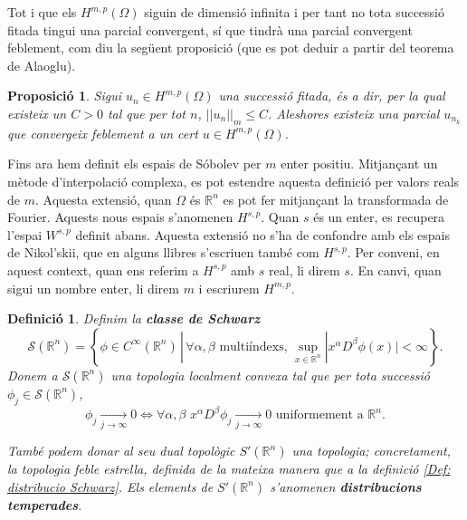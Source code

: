 \documentclass{article}
\numberwithin{equation}{section}
\newtheorem{definicio}{Definici\'{o}}[section]
\newtheorem{proposicio}{Proposici\'{o}}[section]
\begin{document}
Tot i que els $H^{m,p}(\Omega)$ siguin de dimensi\'{o} infinita i per tant no tota successi\'{o} fitada tingui una parcial convergent, s\'{i} que tindr\`{a} una parcial convergent feblement, com diu la seg\"{u}ent proposici\'{o} (que es pot deduir a partir del teorema de Alaoglu).

\begin{proposicio}\label{Pro: Alaoglu}
Sigui $u_n\in H^{m,p}(\Omega)$ una successi\'{o} fitada, \'{e}s a dir, per la qual existeix un $C>0$ tal que per tot $n$, $||u_n||_m\leq C$. Aleshores existeix una parcial $u_{n_k}$ que convergeix feblement a un cert $u\in H^{m,p}(\Omega)$.
\end{proposicio}
\vspace{3mm}

Fins ara hem definit els espais de S\'{o}bolev per $m$ enter positiu. Mitjan\c{c}ant un m\`{e}tode d'interpolaci\'{o} complexa, es pot estendre aquesta definici\'{o} per valors reals de $m$. Aquesta extensi\'{o}, quan $\Omega$ \'{e}s $\mathbb{R}^n$ es pot fer mitjan\c{c}ant la transformada de Fourier. Aquests nous espais s'anomenen $H^{s,p}$. Quan $s$ \'{e}s un enter, es recupera l'espai $W^{s,p}$ definit abans. Aquesta extensi\'{o} no s'ha de confondre amb els espais de Nikol'skii, que en alguns llibres s'escriuen tamb\'{e} com $H^{s,p}$. Per conveni, en aquest context, quan ens referim a $H^{s,p}$ amb $s$ real, li direm $s$. En canvi, quan sigui un nombre enter, li direm $m$ i escriurem $H^{m,p}$.

\begin{definicio}
Definim la \textbf{classe de Schwarz}
\begin{equation}
\mathcal{S}(\mathbb{R}^n)=\left\{\phi\in C^{\infty}(\mathbb{R}^n)\,|\,\forall\alpha,\beta\text{ multi\'{i}ndexs, }\sup_{x\in\mathbb{R}^n}|x^{\alpha}D^{\beta}\phi(x)|<\infty\right\}.
\end{equation}
Donem a $\mathcal{S}(\mathbb{R}^n)$ una topologia localment convexa tal que per tota successi\'{o} $\phi_j\in\mathcal{S}(\mathbb{R}^n)$,
\[\phi_j\xrightarrow[j\to\infty]{}0\Longleftrightarrow\forall\alpha,\beta\,\,x^{\alpha}D^{\beta}\phi_j\xrightarrow[j\to\infty]{}0\text{ uniformement a }\mathbb{R}^n.\]

Tamb\'{e} podem donar al seu dual topol\`{o}gic $S'(\mathbb{R}^n)$ una topologia; concretament, la topologia feble estrella, definida de la mateixa manera que a la definici\'{o} \ref{Def: distribucio Schwarz}. Els elements de $S'(\mathbb{R}^n)$ s'anomenen \textbf{distribucions temperades}.
\end{definicio}
\end{document}
